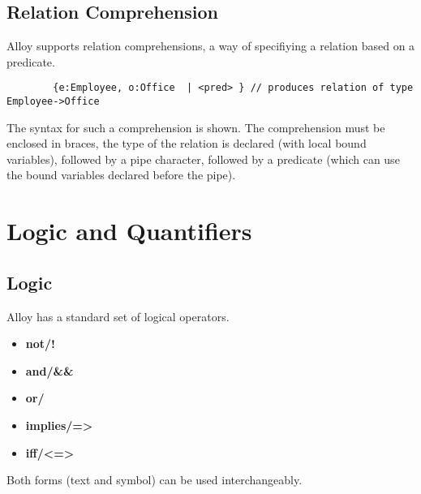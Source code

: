 \documentclass[10pt]{article}
\begin{document}
    \subsection*{Relation Comprehension}
      Alloy supports relation comprehensions, a way of specifiying a relation based on a predicate.
      \begin{lstlisting}
        {e:Employee, o:Office  | <pred> } // produces relation of type Employee->Office
      \end{lstlisting}\par
      The syntax for such a comprehension is shown. The comprehension must be enclosed in braces, the type of the relation is declared (with local bound variables), followed by a pipe character, followed by a predicate (which can use the bound variables declared before the pipe).

  \section*{Logic and Quantifiers}
    \subsection*{Logic}
      Alloy has a standard set of logical operators.
      \begin{itemize}
        \item\textbf{not/!}
        \item\textbf{and/\&\&}
        \item\textbf{or/\textbar\textbar}
        \item\textbf{implies/=\textgreater}
        \item\textbf{iff/\textless=\textgreater}
      \end{itemize}\par
      Both forms (text and symbol) can be used interchangeably.
\end{document}
